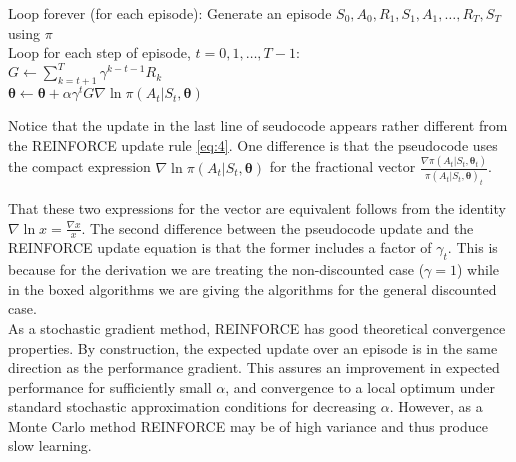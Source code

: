 {\begin{tcolorbox}[colback=black!7!white,colframe=black!75!white,title=\textbf{REINFORCE: Monte-Carlo Policy-Gradient Control (episodic) for $\pi_*$}]
Loop forever (for each episode):
    \qquad Generate an episode $S_0, A_0, R_1, S_1, A_1,\dots,R_T,S_T$ using $\pi$\\
    \qquad Loop for each step of episode, $t=0,1,\dots, T-1$:\\
    \qquad\qquad $G\leftarrow\sum_{k=t+1}^T\gamma^{k-t-1}R_k$\\
    \qquad\qquad $\bm{\theta}\leftarrow \bm{\theta}+\alpha\gamma^tG\nabla\ln\pi(A_t|S_t, \bm{\theta})$
\end{tcolorbox}
Notice that the update in the last line of seudocode appears rather different from the REINFORCE update rule \ref{eq:4}. One difference is that the pseudocode uses the compact expression $\nabla\ln\pi(A_t|S_t, \bm{\theta})$ for the fractional vector $\frac{\nabla\pi(A_t|S_t, \bm{\theta}_t)}{\pi(A_t|S_t, \bm{\theta})_t}$. 

That these two expressions for the vector are equivalent follows from the identity $\nabla\ln x=\frac{\nabla x}{x}$.
The second difference between the pseudocode update and the REINFORCE update equation is that the former includes a factor of $\gamma_t$. This is because for the derivation we are treating the non-discounted case ($\gamma=1$) while in the boxed
algorithms we are giving the algorithms for the general discounted case.\\

As a stochastic gradient method, REINFORCE has good theoretical convergence properties. By construction, the expected update over an episode is in the same direction as the performance gradient. This assures an improvement in expected performance for sufficiently small $\alpha$, and convergence to a local optimum under standard stochastic approximation conditions for decreasing $\alpha$. However, as a Monte Carlo method REINFORCE may be of high variance and thus produce slow learning.

}
